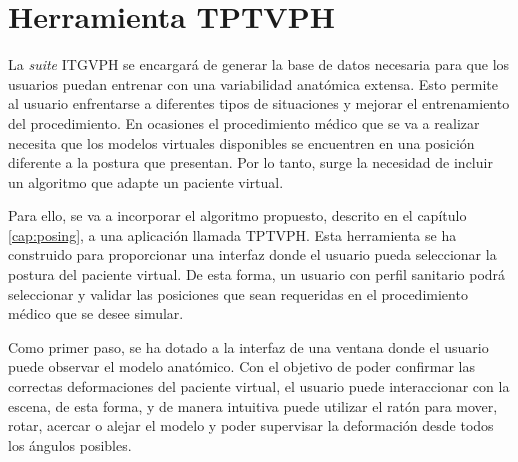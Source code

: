 \section{Herramienta TPTVPH}
\label{rasim:posing}

La \emph{suite} \ac{ITGVPH} se encargará de generar la base de datos necesaria para que los usuarios puedan entrenar con una variabilidad anatómica extensa. Esto permite al usuario enfrentarse a diferentes tipos de situaciones y mejorar el entrenamiento del procedimiento. En ocasiones el procedimiento médico que se va a realizar necesita que los modelos virtuales disponibles se encuentren en una posición diferente a la postura que presentan. Por lo tanto, surge la necesidad de incluir un algoritmo que adapte un paciente virtual.

%


Para ello,  se va a incorporar el algoritmo propuesto, descrito en el capítulo \ref{cap:posing}, a una aplicación llamada \ac{TPTVPH}. Esta herramienta se ha construido para proporcionar una interfaz donde el usuario pueda seleccionar la postura del paciente virtual. De esta forma, un usuario con perfil sanitario podrá seleccionar y validar las posiciones que sean requeridas en el procedimiento médico que se desee simular.



Como primer paso, se ha dotado a la interfaz de una ventana donde el usuario puede observar el modelo anatómico. Con el objetivo de poder confirmar las correctas deformaciones del paciente virtual, el usuario puede interaccionar con la escena, de esta forma, y de manera intuitiva puede utilizar el ratón para mover, rotar, acercar o alejar el modelo y poder supervisar la deformación desde todos los ángulos posibles.

